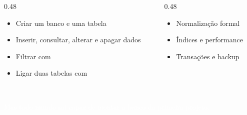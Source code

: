 \begin{frame}{}
  \vspace{0.5em}
  \begin{columns}[T]
    \begin{column}{0.48\textwidth}
      \begin{itemize}
        \item Criar um banco e uma tabela
        \item Inserir, consultar, alterar e apagar dados
        \item Filtrar com 
        \item Ligar duas tabelas com 
      \end{itemize}
    \end{column}
    \begin{column}{0.48\textwidth}
      \begin{itemize}
        \item Normalização formal
        \item Índices e performance
        \item Transações e backup
      \end{itemize}
    \end{column}
  \end{columns}

  \vspace{1.2em}
  \begin{center}
    \\
    \textcolor{white}{Mas todo mundo sai capaz de montar o banco do primeiro projeto.}
  \end{center}

\end{frame}

